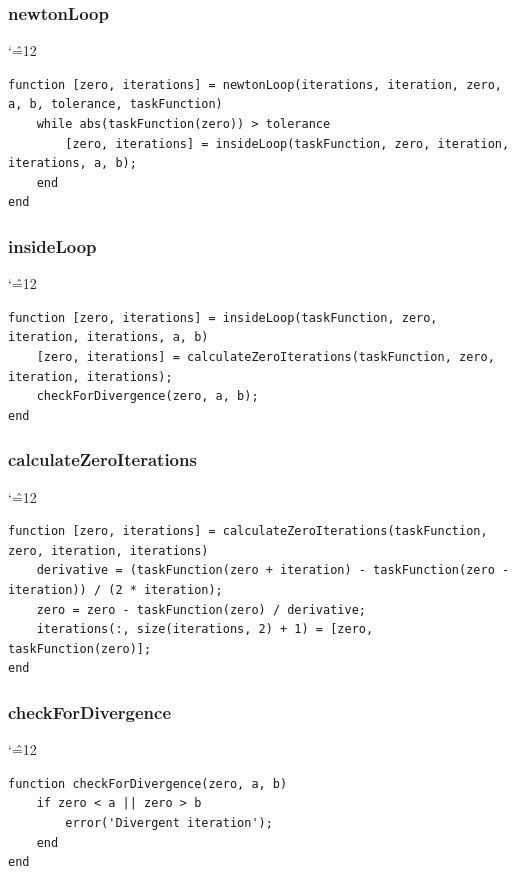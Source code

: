 \documentclass[12pt]{report}
\newenvironment{simplechar}{%
   \catcode`\^=12
}{}
\begin{document}
\subsubsection{newtonLoop}
\begin{simplechar}
\begin{lstlisting}
function [zero, iterations] = newtonLoop(iterations, iteration, zero, a, b, tolerance, taskFunction)
    while abs(taskFunction(zero)) > tolerance
        [zero, iterations] = insideLoop(taskFunction, zero, iteration, iterations, a, b);
    end
end
\end{lstlisting}
\end{simplechar}

\subsubsection{insideLoop}
\begin{simplechar}
\begin{lstlisting}
function [zero, iterations] = insideLoop(taskFunction, zero, iteration, iterations, a, b)
    [zero, iterations] = calculateZeroIterations(taskFunction, zero, iteration, iterations);
    checkForDivergence(zero, a, b);
end
\end{lstlisting}
\end{simplechar}

\subsubsection{calculateZeroIterations}
\begin{simplechar}
\begin{lstlisting}
function [zero, iterations] = calculateZeroIterations(taskFunction, zero, iteration, iterations)
    derivative = (taskFunction(zero + iteration) - taskFunction(zero - iteration)) / (2 * iteration);
    zero = zero - taskFunction(zero) / derivative;
    iterations(:, size(iterations, 2) + 1) = [zero, taskFunction(zero)];
end
\end{lstlisting}
\end{simplechar}

\subsubsection{checkForDivergence}
\begin{simplechar}
\begin{lstlisting}
function checkForDivergence(zero, a, b)
    if zero < a || zero > b
        error('Divergent iteration');
    end
end
\end{lstlisting}
\end{simplechar}
\end{document}
